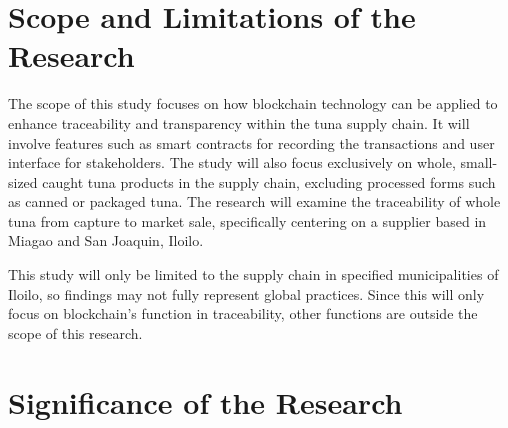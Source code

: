 \section{Scope and Limitations of the Research}
\label{sec:scopelimitations}

The scope of this study focuses on how blockchain technology can be applied to enhance traceability and transparency within the tuna supply chain. It will involve features such as smart contracts for recording the transactions and user interface for stakeholders. The study will also focus exclusively on whole, small-sized caught tuna products in the supply chain, excluding processed forms such as canned or packaged tuna. The research will examine the traceability of whole tuna from capture to market sale, specifically centering on a supplier based in Miagao and San Joaquin, Iloilo. 

\noindent This study will only be limited to the supply chain in specified municipalities of Iloilo, so findings may not fully represent global practices. Since this will only focus on blockchain’s function in traceability, other functions are outside the scope of this research. 


\begin{comment}

%
%
Generally, one paragraph should be allotted for each of your research objectives.

Each paragraph contains a brief overview of the concept/theory and the purpose of doing the associated objective.

Each paragraph also includes a description of the scope/limitation of your study.

* Please refer to the slides for examples.

\end{comment}


\section{Significance of the Research}
\label{sec:significance}

